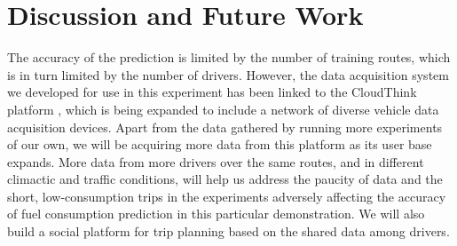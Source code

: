 \section{Discussion and Future Work} \label{sec:future}

The accuracy of the prediction is limited by the number of training routes, which is in turn limited by the number of drivers. However, the data acquisition system we developed for use in this experiment has been linked to the CloudThink platform \cite{CT:WP:2013}, which is being expanded to include a network of diverse vehicle data acquisition devices. Apart from the data gathered by running more experiments of our own, we will be acquiring more data from this platform as its user base expands. More data from more drivers over the same routes, and in different climactic and traffic conditions, will help us address the paucity of data and the short, low-consumption trips in the experiments adversely affecting the accuracy of fuel consumption prediction in this particular demonstration. We will also build a social platform for trip planning based on the shared data among drivers.